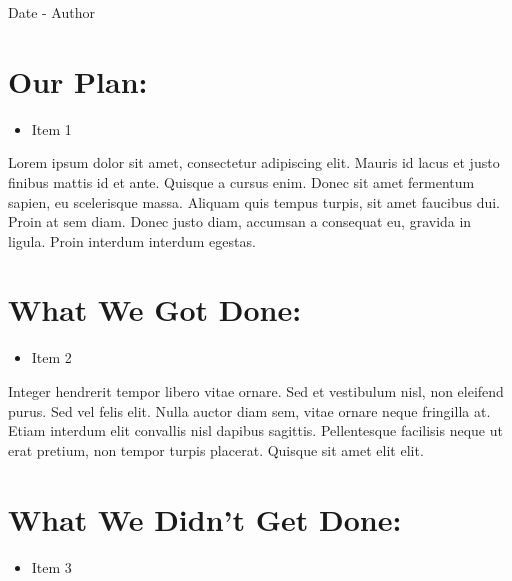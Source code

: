 \documentclass[12pt]{article}
\begin{document}
Date - Author

\section{Our Plan:} %
\begin{itemize}
	\item Item 1
\end{itemize}

Lorem ipsum dolor sit amet, consectetur adipiscing elit. Mauris id lacus et justo finibus mattis id et ante. Quisque a cursus enim. Donec sit amet fermentum sapien, eu scelerisque massa. Aliquam quis tempus turpis, sit amet faucibus dui. Proin at sem diam. Donec justo diam, accumsan a consequat eu, gravida in ligula. Proin interdum interdum egestas.

\section{What We Got Done:} %
\begin{itemize}
	\item Item 2
\end{itemize}

Integer hendrerit tempor libero vitae ornare. Sed et vestibulum nisl, non eleifend purus. Sed vel felis elit. Nulla auctor diam sem, vitae ornare neque fringilla at. Etiam interdum elit convallis nisl dapibus sagittis. Pellentesque facilisis neque ut erat pretium, non tempor turpis placerat. Quisque sit amet elit elit.

\section{What We Didn't Get Done:} %
\begin{itemize}
	\item Item 3
\end{itemize}
\end{document}
